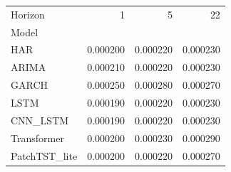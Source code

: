 \begin{tabular}{lrrr}
\toprule
Horizon & 1 & 5 & 22 \\
Model &  &  &  \\
\midrule
HAR & 0.000200 & 0.000220 & 0.000230 \\
ARIMA & 0.000210 & 0.000220 & 0.000230 \\
GARCH & 0.000250 & 0.000280 & 0.000270 \\
LSTM & 0.000190 & 0.000220 & 0.000230 \\
CNN_LSTM & 0.000190 & 0.000220 & 0.000230 \\
Transformer & 0.000200 & 0.000230 & 0.000290 \\
PatchTST_lite & 0.000200 & 0.000220 & 0.000270 \\
\bottomrule
\end{tabular}
